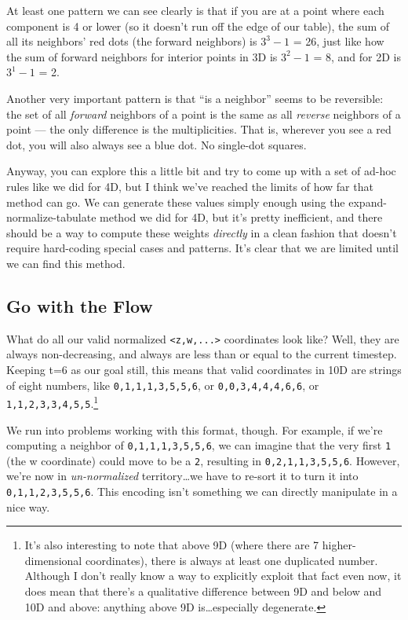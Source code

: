 \documentclass[]{article}
\begin{document}
At least one pattern we can see clearly is that if you are at a point where each
component is 4 or lower (so it doesn't run off the edge of our table), the sum
of all its neighbors' red dots (the forward neighbors) is \(3^3-1\) = 26, just
like how the sum of forward neighbors for interior points in 3D is \(3^2-1\) =
8, and for 2D is \(3^1-1\) = 2.

Another very important pattern is that ``is a neighbor'' seems to be reversible:
the set of all \emph{forward} neighbors of a point is the same as all
\emph{reverse} neighbors of a point --- the only difference is the
multiplicities. That is, wherever you see a red dot, you will also always see a
blue dot. No single-dot squares.

Anyway, you can explore this a little bit and try to come up with a set of
ad-hoc rules like we did for 4D, but I think we've reached the limits of how far
that method can go. We can generate these values simply enough using the
expand-normalize-tabulate method we did for 4D, but it's pretty inefficient, and
there should be a way to compute these weights \emph{directly} in a clean
fashion that doesn't require hard-coding special cases and patterns. It's clear
that we are limited until we can find this method.

\hypertarget{go-with-the-flow}{%
\subsection{Go with the Flow}\label{go-with-the-flow}}

What do all our valid normalized \texttt{\textless{}z,w,...\textgreater{}}
coordinates look like? Well, they are always non-decreasing, and always are less
than or equal to the current timestep. Keeping t=6 as our goal still, this means
that valid coordinates in 10D are strings of eight numbers, like
\texttt{0,1,1,1,3,5,5,6}, or \texttt{0,0,3,4,4,4,6,6}, or
\texttt{1,1,2,3,3,4,5,5}.\footnote{It's also interesting to note that above 9D
  (where there are 7 higher-dimensional coordinates), there is always at least
  one duplicated number. Although I don't really know a way to explicitly
  exploit that fact even now, it does mean that there's a qualitative difference
  between 9D and below and 10D and above: anything above 9D is\ldots especially
  degenerate.}

We run into problems working with this format, though. For example, if we're
computing a neighbor of \texttt{0,1,1,1,3,5,5,6}, we can imagine that the very
first \texttt{1} (the w coordinate) could move to be a \texttt{2}, resulting in
\texttt{0,2,1,1,3,5,5,6}. However, we're now in \emph{un-normalized}
territory\ldots we have to re-sort it to turn it into \texttt{0,1,1,2,3,5,5,6}.
This encoding isn't something we can directly manipulate in a nice way.
\end{document}
